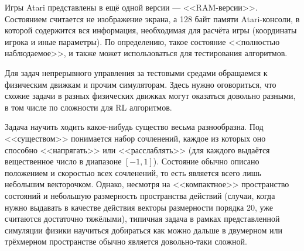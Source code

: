 \begin{example}
Игры Atari представлены в ещё одной версии --- <<RAM-версии>>. Состоянием считается не изображение экрана, а 128 байт памяти Atari-консоли, в которой содержится вся информация, необходимая для расчёта игры (координаты игрока и иные параметры). По определению, такое состояние <<полностью наблюдаемое>>, и также может использоваться для тестирования алгоритмов.
\end{example}

Для задач непрерывного управления за тестовыми средами обращаемся к физическим движкам и прочим симуляторам. Здесь нужно оговориться, что схожие задачи в разных физических движках могут оказаться довольно разными, в том числе по сложности для RL алгоритмов.

\begin{exampleBox}[righthand ratio=0.25, sidebyside, sidebyside align=center, lower separated=false]{}
Задача научить ходить какое-нибудь существо весьма разнообразна. Под <<существом>> понимается набор сочленений, каждое из которых оно способно <<напрягать>> или <<расслаблять>> (для каждого выдаётся вещественное число в диапазоне $[-1, 1]$). Состояние обычно описано положением и скоростью всех сочленений, то есть является всего лишь небольшим векторочком. Однако, несмотря на <<компактное>> пространство состояний и небольшую размерность пространства действий (случаи, когда нужно выдавать в качестве действия векторы размерности порядка 20, уже считаются достаточно тяжёлыми), типичная задача в рамках представленной симуляции физики научиться добираться как можно дальше в двумерном или трёхмерном пространстве обычно является довольно-таки сложной.


\end{exampleBox}
